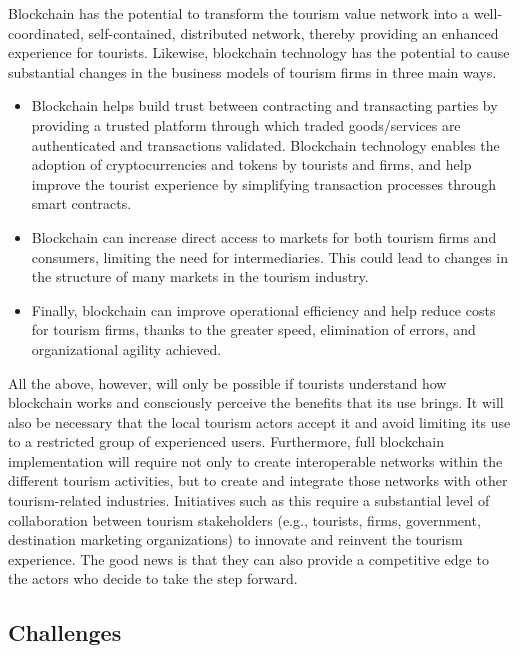 \documentclass[
  letterpaper,
  DIV=11,
  numbers=noendperiod]{scrreprt}
\begin{document}
Blockchain has the potential to transform the tourism value network into
a well-coordinated, self-contained, distributed network, thereby
providing an enhanced experience for tourists. Likewise, blockchain
technology has the potential to cause substantial changes in the
business models of tourism firms in three main ways.

\begin{itemize}
\item
  Blockchain helps build trust between contracting and transacting
  parties by providing a trusted platform through which traded
  goods/services are authenticated and transactions validated.
  Blockchain technology enables the adoption of cryptocurrencies and
  tokens by tourists and firms, and help improve the tourist experience
  by simplifying transaction processes through smart contracts.
\item
  Blockchain can increase direct access to markets for both tourism
  firms and consumers, limiting the need for intermediaries. This could
  lead to changes in the structure of many markets in the tourism
  industry.
\item
  Finally, blockchain can improve operational efficiency and help reduce
  costs for tourism firms, thanks to the greater speed, elimination of
  errors, and organizational agility achieved.
\end{itemize}

All the above, however, will only be possible if tourists understand how
blockchain works and consciously perceive the benefits that its use
brings. It will also be necessary that the local tourism actors accept
it and avoid limiting its use to a restricted group of experienced
users. Furthermore, full blockchain implementation will require not only
to create interoperable networks within the different tourism
activities, but to create and integrate those networks with other
tourism-related industries. Initiatives such as this require a
substantial level of collaboration between tourism stakeholders (e.g.,
tourists, firms, government, destination marketing organizations) to
innovate and reinvent the tourism experience. The good news is that they
can also provide a competitive edge to the actors who decide to take the
step forward.

\hypertarget{challenges-2}{%
\subsection{Challenges}\label{challenges-2}}
\end{document}
